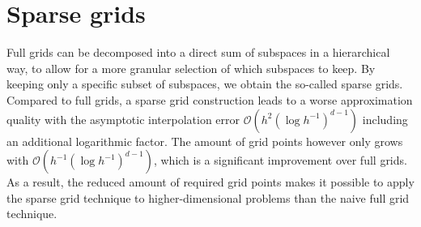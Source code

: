 \documentclass[
  a4paper,  %
  twoside,  %
  bibliography=totoc,
  headsepline,
  cleardoublepage=empty,
  parskip=half,
  draft=false
]{scrbook}
\begin{document}
\section{Sparse grids}

Full grids can be decomposed into a direct sum of subspaces in a hierarchical way, to allow for a more granular selection of which subspaces to keep.
By keeping only a specific subset of subspaces, we obtain the so-called sparse grids.
Compared to full grids, a sparse grid construction leads to a worse approximation quality with the asymptotic interpolation error $\mathcal{O}(h^2 (\log h^{-1})^{d-1})$ including an additional logarithmic factor.
The amount of grid points however only grows with $\mathcal{O}(h^{-1} (\log h^{-1})^{d-1})$, which is a significant improvement over full grids.
As a result, the reduced amount of required grid points makes it possible to apply the sparse grid technique to higher-dimensional problems than the naive full grid technique.
\end{document}
